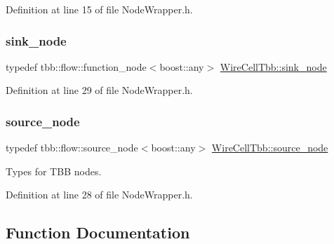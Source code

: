 Definition at line 15 of file Node\+Wrapper.\+h.

\mbox{\label{namespace_wire_cell_tbb_a00d199e066569f374f4baee329bf802c}} 
\subsubsection{\texorpdfstring{sink\+\_\+node}{sink\_node}}
{\footnotesize\ttfamily typedef tbb\+::flow\+::function\+\_\+node$<$boost\+::any$>$ \hyperlink{namespace_wire_cell_tbb_a00d199e066569f374f4baee329bf802c}{Wire\+Cell\+Tbb\+::sink\+\_\+node}}



Definition at line 29 of file Node\+Wrapper.\+h.

\mbox{\label{namespace_wire_cell_tbb_a5f0d1bf6be0fa850153848d32d3e6f1e}} 
\subsubsection{\texorpdfstring{source\+\_\+node}{source\_node}}
{\footnotesize\ttfamily typedef tbb\+::flow\+::source\+\_\+node$<$boost\+::any$>$ \hyperlink{namespace_wire_cell_tbb_a5f0d1bf6be0fa850153848d32d3e6f1e}{Wire\+Cell\+Tbb\+::source\+\_\+node}}



Types for T\+BB nodes. 



Definition at line 28 of file Node\+Wrapper.\+h.



\subsection{Function Documentation}
\mbox{\label{namespace_wire_cell_tbb_a9288a235bfd20c9cecbac374684b9fc3}} 
